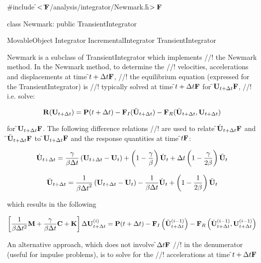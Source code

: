
\indent \#include \f$<\tilde{ }{\bf F}$/analysis/integrator/Newmark.h\f$>{\bf F}$

\indent class Newmark: public TransientIntegrator

\indent MovableObject
\indent\indent Integrator
\indent\indent\indent IncrementalIntegrator
\indent\indent\indent\indent TransientIntegrator
\indent\indent\indent\indent{}

\indent Newmark is a subclass of TransientIntegrator which implements
//! the Newmark method. In the Newmark method, to determine the
//! velocities, accelerations and displacements at time \f$t + \Delta t{\bf F}$,
//! the equilibrium equation (expressed for the TransientIntegrator) is
//! typically solved at time \f$t + \Delta t{\bf F}$ for \f${\bf U}_{t+\Delta t}{\bf F}$,
//! i.e. solve: 

\[ {\bf R} ({\bf U}_{t + \Delta t}) = {\bf P}(t + \Delta t) - {\bf F}_I(\ddot{\bf U}_{t+\Delta t})
- {\bf F}_R(\dot{\bf U}_{t + \Delta t},{\bf U}_{t + \Delta t}) \]

\noindent for \f${\bf U}_{t+\Delta t}{\bf F}$. The following difference relations
//! are used to relate \f$\dot{\bf U}_{t + \Delta t}{\bf F}$ and \f$\ddot{\bf U}_{t + \Delta t}{\bf F}$ to
\f${\bf U}_{t + \Delta t}{\bf F}$ and the response quantities at time \f$t{\bf F}$:

\[
\dot {{\bf U}}_{t + \Delta t} = \frac{\gamma}{\beta \Delta t}
\left( {\bf U}_{t + \Delta t} - {\bf U}_t \right)
 + \left( 1 - \frac{\gamma}{\beta}\right) \dot {{\bf U}}_t + \Delta t \left(1
- \frac{\gamma}{2 \beta}\right) \ddot {{\bf U}}_t 
\]

\[
\ddot {{\bf U}}_{t + \Delta t} = \frac{1}{\beta {\Delta t}^2}
\left( {\bf U}_{t+\Delta t} - {\bf U}_t \right)
 - \frac{1}{\beta \Delta t} \dot {{\bf U}}_t + \left( 1 - \frac{1}{2
\beta} \right) \ddot {{\bf U}}_t 
\]

\noindent which  results in the following 

\[ \left[ \frac{1}{\beta \Delta t^2} {\bf M} + \frac{\gamma}{\beta \Delta t}
{\bf C} + {\bf K} \right] \Delta {\bf U}_{t + \Delta t}^{(i)} = {\bf P}(t + \Delta t) -
{\bf F}_I\left(\ddot{\bf U}_{t+\Delta  t}^{(i-1)}\right)
- {\bf F}_R\left(\dot{\bf U}_{t + \Delta t}^{(i-1)},{\bf U}_{t + \Delta t}^{(i-1)}\right) \]

\noindent An alternative approach, which does not involve \f$\Delta t{\bf F}$
//! in the denumerator (useful for impulse problems), is to solve for the
//! accelerations at time \f$t + \Delta t{\bf F}$ 

